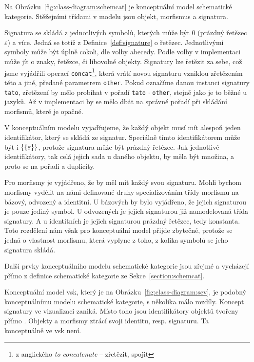 Na Obrázku~\ref{fig:class-diagram:schemcat} je konceptuální model schematické kategorie.
Stěžejními třídami v modelu jsou objekt, morfismus a signatura.

Signatura se skládá z jednotlivých symbolů, kterých může být 0 (prázdný řetězec $\varepsilon$) a více.
Jedná se totiž z Definice~\ref{def:signature} o řetězec.
Jednotlivými symboly může být úplně cokoli, dle volby abecedy.
Podle volby v implementaci může jít o znaky, řetězce, či libovolné objekty.
Signatury lze řetězit za sebe, což jsme vyjádřili operací \texttt{concat}\footnote{z anglického \emph{to concatenate} -- zřetězit, spojit},
která vrátí novou signaturu vzniklou zřetězením této a jiné, předané parametrem \texttt{other}.
Pokud označíme danou instanci signatury \texttt{tato}, zřetězení by mělo probíhat v pořadí \texttt{tato} $\cdot$ \texttt{other}, stejně jako je to běžné u jazyků.
Až v implementaci by se mělo dbát na správné pořadí při skládání morfismů, které je opačné.

V konceptuálním modelu vyjadřujeme, že každý objekt musí mít alespoň jeden identifikátor, který se skládá ze signatur.
Speciálně tímto identifikátorem může být i $\left\{\left\{\varepsilon\right\}\right\}$, protože signatura může být prázdný řetězec.
Jak jednotlivé identifikátory, tak celá jejich sada u daného objektu, by měla být množina, a proto se  na pořadí a duplicity.

Pro morfismy je vyjádřeno, že by měl mít každý svou signaturu.
Mohli bychom morfismy vydělit na námi definované druhy specializováním třídy morfismu na bázový, odvozený a identitní.
U bázových by bylo vyjádřeno, že jejich signaturou je pouze jediný symbol.
U odvozených je jejich signaturou již namodelovaná třída signatury.
A u identitních je jejich signaturou prázdný řetězec, tedy konstanta.
Toto rozdělení nám však pro konceptuální model přijde zbytečné, protože se jedná o vlastnost morfismu, která vyplyne z toho, z kolika symbolů se jeho signatura skládá.

Další prvky konceptuálního modelu schematické kategorie jsou zřejmé a vycházejí přímo z definice schematické kategorie ze Sekce~\ref{section:schemcat}.

Konceptuální model \acrfull{vsk}, který je na Obrázku~\ref{fig:class-diagram:scv}, je podobný konceptuálnímu modelu schematické kategorie, s několika málo rozdíly.
Koncept signatury ve vizualizaci zaniká.
Místo toho jsou identifikátory objektů tvořeny přímo .
Objekty a morfismy ztrácí svoji identitu, resp. signaturu.
Ta konceptuálně ve \acrshort{vsk} není.

